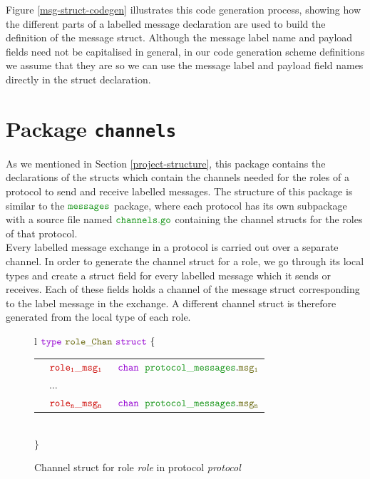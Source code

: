 \documentclass[12pt,twoside]{report}
\begin{document}
Figure \ref{msg-struct-codegen} illustrates this code generation process, showing how the different parts of a labelled message declaration are used to build the definition of the message struct. Although the message label name and payload fields need not be capitalised in general, in our code generation scheme definitions we assume that they are so we can use the message label and payload field names directly in the struct declaration.\\

\section{Package \texttt{channels}}
As we mentioned in Section \ref{project-structure}, this package contains the declarations of the structs which contain the channels needed for the roles of a protocol to send and receive labelled messages. The structure of this package is similar to the $\pkgname{messages}$ package, where each protocol has its own subpackage with a source file named $\filename{channels}$ containing the channel structs for the roles of that protocol.\\

Every labelled message exchange in a protocol is carried out over a separate channel. In order to generate the channel struct for a role, we go through its local types and create a struct field for every labelled message which it sends or receives. Each of these fields holds a channel of the message struct corresponding to the label message in the exchange. A different channel struct is therefore generated from the local type of each role.\\

\begin{figure}[!h]
    \begin{center}
        \begin{tabular}{l}
            $\gotype\ \structname{role\_\!Chan}\ \gostruct\ \{$\\[3pt]
            \begin{tabular}{lll}
                \indent & $\structfield{role_1\_msg_1}$\ &$\gochan\ \;\pkgstructaccess{protocol\_messages}{msg_1}$\\
                \indent & $\dots$ & \\
                \indent & $\structfield{role_n\_msg_n}$\ &$\gochan\ \;\pkgstructaccess{protocol\_messages}{msg_n}$
            \end{tabular}\\
            $\}$
        \end{tabular}
    \end{center}
    \caption{Channel struct for role \textit{role} in protocol \textit{protocol}}
    \label{channel-struct-gen}
\end{figure}
\end{document}
